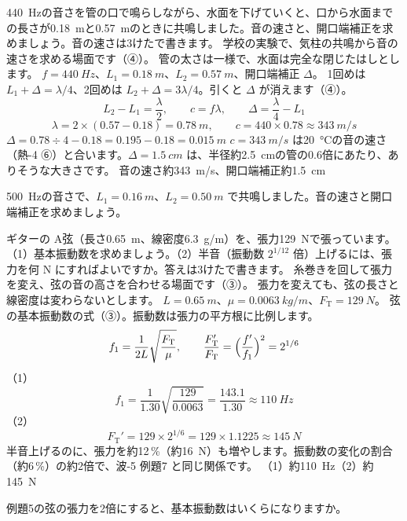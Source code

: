 \label{ph:波-6:ex4}
\begin{phreidai}[気柱の共鳴で音の速さをはかる]
\qty{440}{Hz}の音さを管の口で鳴らしながら、水面を下げていくと、口から水面までの長さが\qty{0.18}{m}と\qty{0.57}{m}のときに共鳴しました。音の速さと、開口端補正を求めましょう。音の速さは3けたで書きます。
\phbamen
学校の実験で、気柱の共鳴から音の速さを求める場面です（④）。
\phmushi
管の太さは一様で、水面は完全な閉じたはしとします。
\phzu
$f=\qty{440}{Hz}$、$L_1=\qty{0.18}{m}$、$L_2=\qty{0.57}{m}$、開口端補正 $\Delta$。
\phriyu
1回めは $L_1+\Delta=\lambda/4$、2回めは $L_2+\Delta=3\lambda/4$。引くと $\Delta$ が消えます（④）。
\phtateru
\[L_2-L_1=\frac{\lambda}{2},\qquad c=f\lambda,\qquad\Delta=\frac{\lambda}{4}-L_1\]
\phtoku
\[\lambda=2\times(0.57-0.18)=\qty{0.78}{m},\qquad c=440\times0.78\approx\qty{343}{m/s}\]
$\Delta=0.78\div4-0.18=0.195-0.18=\qty{0.015}{m}$
\phtashikame
$c=\qty{343}{m/s}$ は\qty{20}{\celsius}の音の速さ（熱-4 ⑥）と合います。$\Delta=\qty{1.5}{cm}$ は、半径約\qty{2.5}{cm}の管の0.6倍にあたり、ありそうな大きさです。
\kotae 音の速さ約\qty{343}{m/s}、開口端補正約\qty{1.5}{cm}
\end{phreidai}
\begin{jibun}
\qty{500}{Hz}の音さで、$L_1=\qty{0.16}{m}$、$L_2=\qty{0.50}{m}$ で共鳴しました。音の速さと開口端補正を求めましょう。
\end{jibun}

\label{ph:波-6:ex5}
\begin{phreidai}[弦の張力と音の高さ]
ギターの A弦（長さ\qty{0.65}{m}、線密度\qty{6.3}{g/m}）を、張力\qty{129}{N}で張っています。（1）基本振動数を求めましょう。（2）半音（振動数 $2^{1/12}$ 倍）上げるには、張力を何 N にすればよいですか。答えは3けたで書きます。
\phbamen
糸巻きを回して張力を変え、弦の音の高さを合わせる場面です（③）。
\phmushi
張力を変えても、弦の長さと線密度は変わらないとします。
\phzu
$L=\qty{0.65}{m}$、$\mu=\qty{0.0063}{kg/m}$、$F_{\mathrm T}=\qty{129}{N}$。
\phriyu
弦の基本振動数の式（③）。振動数は張力の平方根に比例します。
\phtateru
\[f_1=\frac{1}{2L}\sqrt{\frac{F_{\mathrm T}}{\mu}},\qquad\frac{F_{\mathrm T}'}{F_{\mathrm T}}=\Bigl(\frac{f'}{f_1}\Bigr)^2=2^{1/6}\]
\phtoku
（1）\[f_1=\frac{1}{1.30}\sqrt{\frac{129}{0.0063}}=\frac{143.1}{1.30}\approx\qty{110}{Hz}\]
（2）\[F_{\mathrm T}'=129\times2^{1/6}=129\times1.1225\approx\qty{145}{N}\]
\phtashikame
半音上げるのに、張力を約12\,\%（約\qty{16}{N}）も増やします。振動数の変化の割合（約6\,\%）の約2倍で、波-5 例題7 と同じ関係です。
\kotae （1）約\qty{110}{Hz}（2）約\qty{145}{N}
\end{phreidai}
\begin{jibun}
例題5の弦の張力を2倍にすると、基本振動数はいくらになりますか。
\end{jibun}


